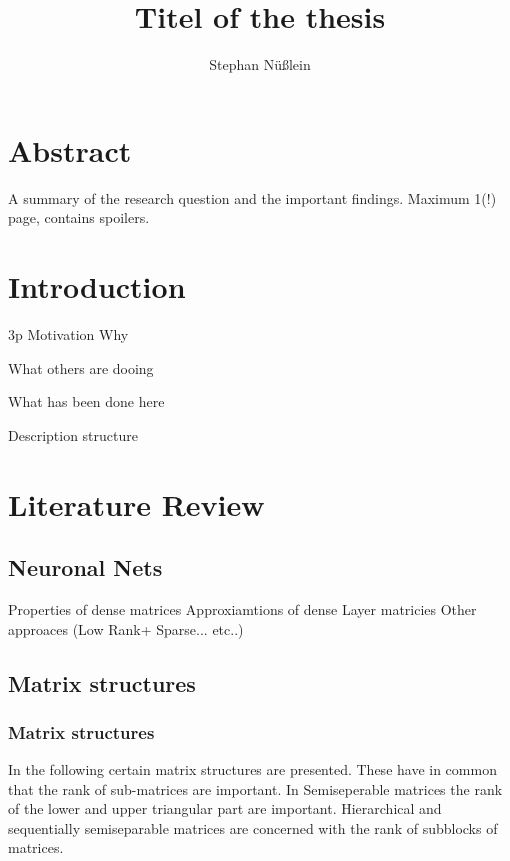 \documentclass[doctype=mastersthesis,BCOR=15mm,biblatex]{ldvbook}%
\begin{document}
\title{Titel of the thesis}
\author{Stephan Nüßlein}


\maketitle[frontcover=Design1]


\chapter*{Abstract}

A summary of the research question and the important findings.
Maximum 1(!) page, contains spoilers.


\tableofcontents









\chapter{Introduction} 3p
Motivation Why

What others are dooing

What has been done here


Description structure


\chapter{Literature Review}
\section{Neuronal Nets}
Properties of dense matrices
Approxiamtions of dense Layer matricies
Other approaces (Low Rank+ Sparse... etc..)

\section{Matrix structures}
\subsection{Matrix structures}
In the following certain matrix structures are presented.
These have in common that the rank of sub-matrices are important.
In Semiseperable matrices the rank of the lower and upper triangular part are important.
Hierarchical and sequentially semiseparable matrices are concerned with the rank of subblocks of matrices.  
\end{document}
